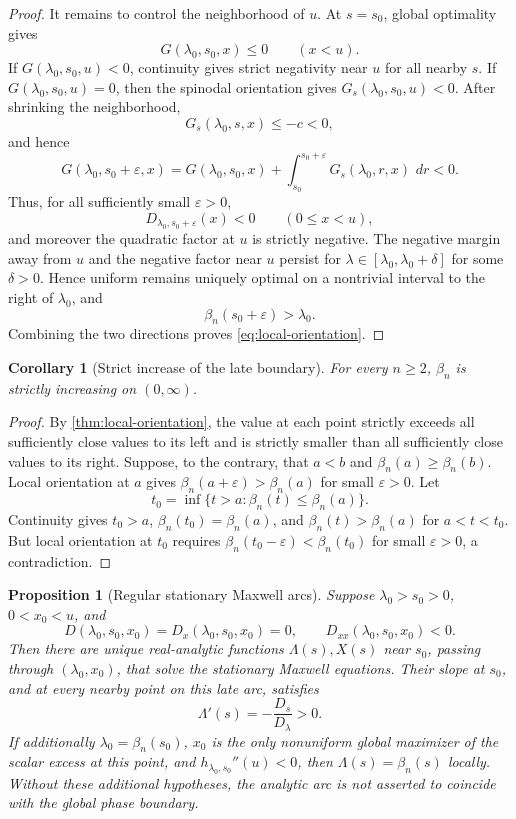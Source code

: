\documentclass[11pt]{article}
\theoremstyle{plain}
\newtheorem{proposition}[theorem]{Proposition}
\newtheorem{corollary}[theorem]{Corollary}
\theoremstyle{definition}
\theoremstyle{remark}
\newcommand{\dd}{\,d}
\begin{document}
\begin{proof}
It remains to control the neighborhood of \(u\).  At \(s=s_0\), global optimality gives
\[
G(\lambda_0,s_0,x)\le0
\qquad(x<u).
\]
If \(G(\lambda_0,s_0,u)<0\), continuity gives strict negativity near \(u\) for all nearby \(s\).  If \(G(\lambda_0,s_0,u)=0\), then the spinodal orientation gives \(G_s(\lambda_0,s_0,u)<0\).  After shrinking the neighborhood,
\[
G_s(\lambda_0,s,x)\le-c<0,
\]
and hence
\[
G(\lambda_0,s_0+\varepsilon,x)
=G(\lambda_0,s_0,x)
+\int_{s_0}^{s_0+\varepsilon}G_s(\lambda_0,r,x)\,\dd r
<0.
\]
Thus, for all sufficiently small \(\varepsilon>0\),
\[
D_{\lambda_0,s_0+\varepsilon}(x)<0
\qquad(0\le x<u),
\]
and moreover the quadratic factor at \(u\) is strictly negative.  The negative margin away from \(u\) and the negative factor near \(u\) persist for \(\lambda\in[\lambda_0,\lambda_0+\delta]\) for some \(\delta>0\).  Hence uniform remains uniquely optimal on a nontrivial interval to the right of \(\lambda_0\), and
\[
\beta_n(s_0+\varepsilon)>\lambda_0.
\]
Combining the two directions proves \eqref{eq:local-orientation}.
\end{proof}

\begin{corollary}[Strict increase of the late boundary]\label{cor:beta-strict-new}
For every \(n\ge2\), \(\beta_n\) is strictly increasing on \((0,\infty)\).
\end{corollary}

\begin{proof}
By \cref{thm:local-orientation}, the value at each point strictly exceeds all sufficiently close values to its left and is strictly smaller than all sufficiently close values to its right.  Suppose, to the contrary, that \(a<b\) and \(\beta_n(a)\ge\beta_n(b)\).  Local orientation at \(a\) gives \(\beta_n(a+\varepsilon)>\beta_n(a)\) for small \(\varepsilon>0\).  Let
\[
t_0=\inf\{t>a:\beta_n(t)\le\beta_n(a)\}.
\]
Continuity gives \(t_0>a\), \(\beta_n(t_0)=\beta_n(a)\), and \(\beta_n(t)>\beta_n(a)\) for \(a<t<t_0\).  But local orientation at \(t_0\) requires \(\beta_n(t_0-\varepsilon)<\beta_n(t_0)\) for small \(\varepsilon>0\), a contradiction.
\end{proof}

\begin{proposition}[Regular stationary Maxwell arcs]\label{prop:regular-maxwell-arcs}
Suppose \(\lambda_0>s_0>0\), \(0<x_0<u\), and
\[
D(\lambda_0,s_0,x_0)=D_x(\lambda_0,s_0,x_0)=0,
\qquad D_{xx}(\lambda_0,s_0,x_0)<0.
\]
Then there are unique real-analytic functions \(\Lambda(s),X(s)\) near \(s_0\),
passing through \((\lambda_0,x_0)\), that solve the stationary Maxwell equations.
Their slope at \(s_0\), and at every nearby point on this late arc, satisfies
\begin{equation}\label{eq:beta-slope-new}
\Lambda'(s)=-\frac{D_s}{D_\lambda}>0.
\end{equation}
If additionally \(\lambda_0=\beta_n(s_0)\), \(x_0\) is the only nonuniform global
maximizer of the scalar excess at this point, and \(h_{\lambda_0,s_0}''(u)<0\),
then \(\Lambda(s)=\beta_n(s)\) locally.  Without these additional hypotheses,
the analytic arc is not asserted to coincide with the global phase boundary.
\end{proposition}
\end{document}
